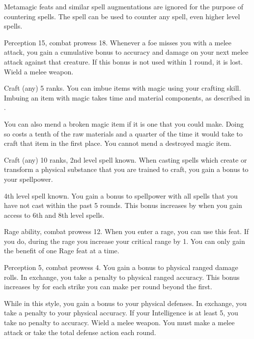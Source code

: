 Metamagic feats and similar spell augmentations are ignored for the purpose of countering spells.
The  spell can be used to counter any spell, even higher level spells.

\featpres Perception 15, combat prowess 18.
\featben Whenever a foe misses you with a melee attack, you gain a cumulative  bonus to accuracy and damage on your next melee attack against that creature.
If this bonus is not used within 1 round, it is lost.
\stylereq Wield a melee weapon.

\featpre Craft (any) 5 ranks.
\featben You can imbue items with magic using your crafting skill.
Imbuing an item with magic takes time and material components, as described in .

You can also mend a broken magic item if it is one that you could make.
Doing so costs a tenth of the raw materials and a quarter of the time it would take to craft that item in the first place.
You cannot mend a destroyed magic item.

\featpres Craft (any) 10 ranks, 2nd level spell known.
\featben When casting spells which create or transform a physical substance that you are trained to craft, you gain a  bonus to your spellpower.

\featpre 4th level spell known.
\featben You gain a  bonus to spellpower with all spells that you have not cast within the past 5 rounds.
This bonus increases by  when you gain access to 6th and 8th level spells.

\featpres Rage ability, combat prowess 12.
\featben When you enter a rage, you can use this feat. If you do, during the rage you increase your critical range by 1.
 You can only gain the benefit of one Rage feat at a time.

\featpres Perception 5, combat prowess 4.
\featben You gain a  bonus to physical ranged damage rolls.
In exchange, you take a  penalty to physical ranged accuracy.
This bonus increases by  for each strike you can make per round beyond the first.

\featben While in this style, you gain a  bonus to your physical defenses.
In exchange, you take a  penalty to your physical accuracy.
If your Intelligence is at least 5, you take no penalty to accuracy.
\stylereq Wield a melee weapon. You must make a melee attack or take the total defense action each round.


